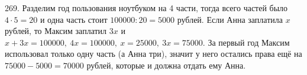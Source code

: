 269. Разделим год пользования ноутбуком на 4 части, тогда всего частей было $4\cdot5=20$ и одна часть стоит $100000:20=5000$ рублей. Если Анна заплатила $x$ рублей, то Максим заплатил $3x$ и $x+3x=100000,\ 4x=100000,\ x=25000,\ 3x=75000.$ За первый год Максим использовал только одну часть (а Анна три), значит у него остались права ещё на $75000-5000=70000$ рублей, которые и должна отдать ему Анна.\\
